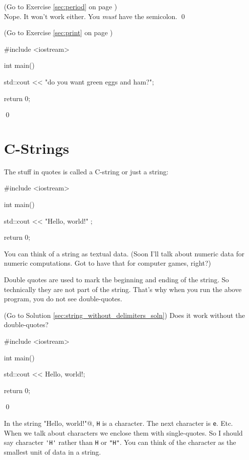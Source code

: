 \begin{soln}
\label{sec:period_soln} 
(Go to Exercise \ref{sec:period} 
on page \pageref{sec:period})
\\
Nope. It won't work either. 
You \textit{must} have the semicolon.
\qed
\end{soln}


\begin{soln}
\label{sec:print_soln} 
(Go to Exercise \ref{sec:print} 
on page \pageref{sec:print})
\begin{console}
#include <iostream>

int main()
{
    std::cout << "do you want green eggs and ham?\n";

    return 0;
}
\end{console}
\qed
\end{soln}





\newpage\section{C-Strings}

The stuff in quotes is called a C-string or just a string:
\begin{console}
#include <iostream>

int main()
{
    std::cout << "Hello, world!\n" ;

    return 0;
}
\end{console}

You can think of a string as textual data. 
(Soon I'll talk about numeric data for numeric computations. 
Got to have that for computer games, right?)

Double quotes are used to mark the beginning and ending of the string. 
So technically they are not part of the string. 
That's why when you run the above program, you do not see double-quotes.


\begin{ex} \label{sec:string_without_delimiters}
(Go to Solution \ref{sec:string_without_delimiters_soln})
Does it work without the double-quotes?
\begin{console}
#include <iostream>

int main()
{
    std::cout << Hello, world!\n;

    return 0;
}
\end{console}
\qed
\end{ex}

In the string 
\verb@"Hello, world!\n"@, 
\verb!H! is a character. 
The next character is \verb!e!. Etc. 
When we talk about characters we enclose them with single-quotes. 
So I should say character \verb!'H'! rather than 
\verb!H! or \verb!"H"!. 
You can think of the character as the smallest unit of data in a string. 


